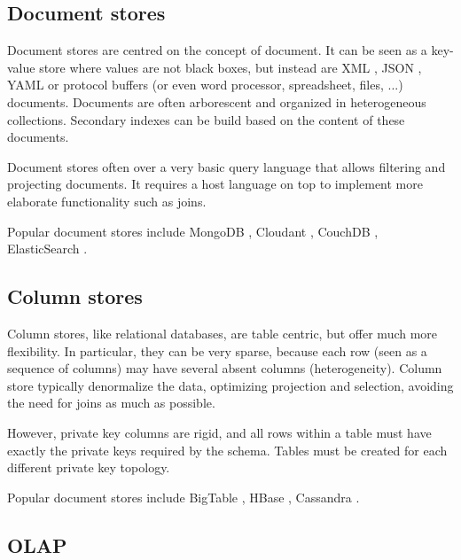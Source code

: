 \documentclass{vldb}
\begin{document}
\subsection{Document stores}

Document stores are centred on the concept of document. It can be seen as a key-value store where values are not black boxes, but instead are XML \cite{XML}, JSON \cite{JSON}, YAML \cite{YAML} or protocol buffers \cite{ProtocolBuffers} (or even word processor, spreadsheet, files, ...) documents. Documents are often arborescent and organized in heterogeneous collections. Secondary indexes can be build based on the content of these documents.

Document stores often over a very basic query language that allows filtering and projecting documents. It requires a host language on top to implement more elaborate functionality such as joins. 

Popular document stores include MongoDB \cite{MongoDB}, Cloudant \cite{Cloudant}, CouchDB \cite{CouchDB}, ElasticSearch \cite{ElasticSearch}.

\subsection{Column stores}

Column stores, like relational databases, are table centric, but offer much more flexibility. In particular, they can be very sparse, because each row (seen as a sequence of columns) may have several absent columns (heterogeneity). Column store typically denormalize the data, optimizing projection and selection, avoiding the need for joins as much as possible.

However, private key columns are rigid, and all rows within a table must have exactly the private keys required by the schema. Tables must be created for each different private key topology.

Popular document stores include BigTable \cite{Chang2008}, HBase \cite{HBase}, Cassandra \cite{Lakshman2010}.

\subsection{OLAP}
\end{document}
